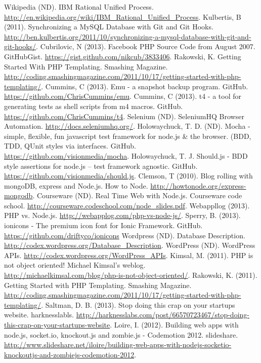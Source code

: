 \newpage
\begin{thebibliography}{9}
 Wikipedia (ND). IBM Rational Unified Process.
  \url{http://en.wikipedia.org/wiki/IBM\_Rational\_Unified\_Process}.
 Kulbertis, B (2011). Synchronizing a MySQL Database with
  Git and Git
  Hooks. \url{http://ben.kulbertis.org/2011/10/synchronizing-a-mysql-database-with-git-and-git-hooks/}.
 Cubrilovic, N (2013). Facebook PHP Source Code from
  August 2007. GitHubGist. \url{https://gist.github.com/nikcub/3833406}.
 Rakowski, K. Getting Started With PHP
  Templating. Smashing
  Magazine. \url{http://coding.smashingmagazine.com/2011/10/17/getting-started-with-php-templating/}.
 Cummins, C (2013). Emu - a snapshot backup
  program. GitHub. \url{https://github.com/ChrisCummins/emu}.
 Cummins, C (2013). t4 - a tool for generating tests as
shell scripts from m4 macros. GitHub. \url{https://github.com/ChrisCummins/t4}.
 Selenium (ND). SeleniumHQ Browser
Automation. \url{http://docs.seleniumhq.org/}.
 Holowaychuck, T. D. (ND). Mocha - simple, flexible, fun
javascript test framework for node.js \& the browser. (BDD, TDD, QUnit styles
via interfaces. GitHub. \url{https://github.com/visionmedia/mocha}.
 Holowaychuck, T. J. Should.js - BDD style assertions
for node.js -- test framework
agnostic. GitHub. \url{https://github.com/visionmedia/should.js}.
 Clemson, T (2010). Blog rolling with mongoDB, express and
Node.js. How to Node. \url{http://howtonode.org/express-mongodb}.
 Courseware (ND). Real Time Web with Node.js. Courseware
code school. \url{http://courseware.codeschool.com/node_slides.pdf}.
 Webappllog (2013). PHP
vs. Node.js. \url{http://webapplog.com/php-vs-node-js/}.
 Sperry, B. (2013). ionicons - The premium icon font for
Ionic Framework. GitHub. \url{https://github.com/driftyco/ionicons}
 Wordpress (ND). Database
Description. \url{http://codex.wordpress.org/Database_Description}.
 WordPress (ND). WordPress
APIs. \url{http://codex.wordpress.org/WordPress_APIs}.
 Kimsal, M. (2011). PHP is not object oriented! Michael Kimsal's
weblog. \url{http://michaelkimsal.com/blog/php-is-not-object-oriented/}.
 Rakowski, K. (2011). Getting Started with PHP
Templating. Smashing Magazine.
\url{http://coding.smashingmagazine.com/2011/10/17/getting-started-with-php-templating/}.
 Saltman, D. B. (2013). Stop doing this crap on your
startups website. harknesslabls.
\url{http://harknesslabs.com/post/66570723467/stop-doing-this-crap-on-your-startups-website}.
 Loire, I. (2012). Building web apps with node.js, socket.io,
knockout.js and zombie.js - Codemotion 2012. slideshare.
\url{http://www.slideshare.net/iloire/building-web-apps-with-nodejs-socketio-knockoutjs-and-zombiejs-codemotion-2012}.
\end{thebibliography}
